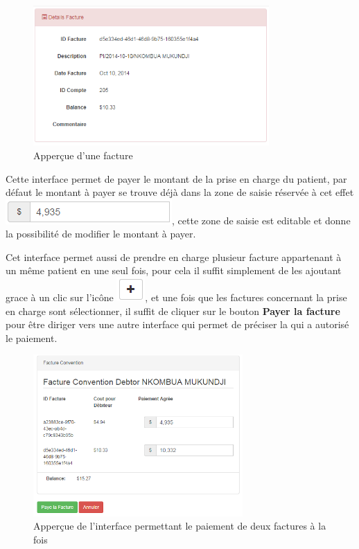 \documentclass[12pt,a4paper]{report}
\begin{document}
\newpage
\begin{figure}[h]
\begin{center}
\includegraphics[width=9cm]{pic/DetailConv.png}
\end{center}
\caption{Apperçue d'une facture}
\label{Apperçue d'une facture}
\end{figure}


Cette interface permet de payer le montant de la prise en charge du patient, par défaut le montant à payer se trouve déjà dans la zone de saisie réservée à cet effet \includegraphics[scale=0.7]{pic/editableDeb.png}, cette zone de saisie est editable et donne la possibilité de modifier le montant à payer. 

Cet interface permet aussi de prendre en charge plusieur facture appartenant à un même patient en une seul fois, pour cela il suffit simplement de les ajoutant grace à un clic sur l'icône \includegraphics[scale=0.7]{pic/plusBlack.png}, et une fois que les factures concernant la prise en charge sont sélectionner, il suffit de cliquer sur le bouton \textbf{Payer la facture} pour être diriger vers une autre interface qui permet de préciser la qui a autorisé le paiement.

\begin{figure}[h]
\begin{center}
\includegraphics[width=8cm]{pic/DoubleConvention.png}
\end{center}
\caption{Apperçue de l'interface permettant le paiement de deux factures à la fois}
\label{Apperçue de l'interface permettant le paiement de deux factures à la fois}
\end{figure}
\end{document}
